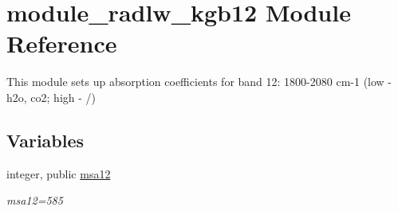 \hypertarget{namespacemodule__radlw__kgb12}{}\section{module\+\_\+radlw\+\_\+kgb12 Module Reference}
\label{namespacemodule__radlw__kgb12}


This module sets up absorption coefficients for band 12\+: 1800-\/2080 cm-\/1 (low -\/ h2o, co2; high -\/ /)  


\subsection*{Variables}
\begin{DoxyCompactItemize}
\item 
\mbox{\label{namespacemodule__radlw__kgb12_ad1ddd94fe11b11485502d1fe6f5a1615}} 
integer, public \hyperlink{namespacemodule__radlw__kgb12_ad1ddd94fe11b11485502d1fe6f5a1615}{msa12}
\begin{DoxyCompactList}\small\item\em msa12=585 \end{DoxyCompactList}\end{DoxyCompactItemize}
